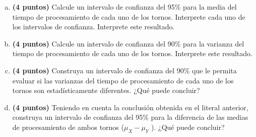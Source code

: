 \documentclass[../main.tex]{subfiles}
\begin{document}
\begin{enumerate}[(a)]

\item \textbf{(4 puntos)} Calcule un intervalo de confianza del 95\% para la media del tiempo de procesamiento de cada uno de los tornos. Interprete cada uno de los intervalos de confianza.
Interprete este resultado.

\item \textbf{(4 puntos)} Calcule un intervalo de confianza del 90\% para la varianza del tiempo de procesamiento de cada uno de los tornos. Interprete este resultado.

\item \textbf{(4 puntos)} Construya un intervalo de confianza del 90\% que le permita evaluar si las varianzas del tiempo de procesamiento de cada uno de los tornos son estadísticamente
diferentes. ¿Qué puede concluir?

\item \textbf{(4 puntos)} Teniendo en cuenta la conclusión obtenida en el literal anterior, construya un intervalo de confianza del 95\% para la diferencia de las medias de procesamiento de ambos tornos ($\mu_X - \mu_Y$ ). ¿Qué puede concluir?

\end{enumerate}
\end{document}
